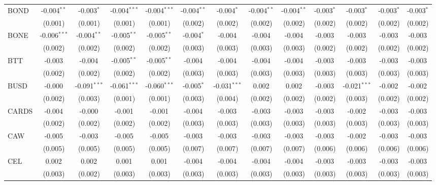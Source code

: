 \begin{table}[!htbp]
\begin{tabular}{@{\extracolsep{5pt}}lcccccccccccc}
 BOND & -0.004$^{**}$ & -0.003$^{*}$ & -0.004$^{***}$ & -0.004$^{***}$ & -0.004$^{**}$ & -0.004$^{*}$ & -0.004$^{**}$ & -0.004$^{**}$ & -0.003$^{*}$ & -0.003$^{*}$ & -0.003$^{*}$ & -0.003$^{*}$ \\
  & (0.001) & (0.001) & (0.001) & (0.001) & (0.002) & (0.002) & (0.002) & (0.002) & (0.002) & (0.002) & (0.002) & (0.002) \\
 BONE & -0.006$^{***}$ & -0.004$^{**}$ & -0.005$^{**}$ & -0.005$^{**}$ & -0.004$^{*}$ & -0.004$^{}$ & -0.004$^{}$ & -0.004$^{}$ & -0.003$^{}$ & -0.003$^{}$ & -0.003$^{}$ & -0.003$^{}$ \\
  & (0.002) & (0.002) & (0.002) & (0.002) & (0.003) & (0.003) & (0.003) & (0.003) & (0.002) & (0.002) & (0.002) & (0.002) \\
 BTT & -0.003$^{}$ & -0.004$^{}$ & -0.005$^{**}$ & -0.005$^{**}$ & -0.004$^{}$ & -0.004$^{}$ & -0.004$^{}$ & -0.004$^{}$ & -0.003$^{}$ & -0.003$^{}$ & -0.003$^{}$ & -0.003$^{}$ \\
  & (0.002) & (0.002) & (0.002) & (0.002) & (0.003) & (0.003) & (0.003) & (0.003) & (0.003) & (0.003) & (0.003) & (0.003) \\
 BUSD & -0.000$^{}$ & -0.091$^{***}$ & -0.061$^{***}$ & -0.060$^{***}$ & -0.005$^{*}$ & -0.031$^{***}$ & 0.002$^{}$ & 0.002$^{}$ & -0.003$^{}$ & -0.021$^{***}$ & -0.002$^{}$ & -0.002$^{}$ \\
  & (0.002) & (0.003) & (0.001) & (0.001) & (0.003) & (0.004) & (0.002) & (0.002) & (0.002) & (0.003) & (0.002) & (0.002) \\
 CARDS & -0.004$^{}$ & -0.000$^{}$ & -0.001$^{}$ & -0.001$^{}$ & -0.004$^{}$ & -0.003$^{}$ & -0.003$^{}$ & -0.003$^{}$ & -0.003$^{}$ & -0.002$^{}$ & -0.003$^{}$ & -0.003$^{}$ \\
  & (0.002) & (0.002) & (0.002) & (0.002) & (0.003) & (0.003) & (0.003) & (0.003) & (0.003) & (0.003) & (0.003) & (0.003) \\
 CAW & -0.005$^{}$ & -0.003$^{}$ & -0.005$^{}$ & -0.005$^{}$ & -0.003$^{}$ & -0.003$^{}$ & -0.003$^{}$ & -0.003$^{}$ & -0.003$^{}$ & -0.002$^{}$ & -0.003$^{}$ & -0.003$^{}$ \\
  & (0.005) & (0.005) & (0.005) & (0.005) & (0.007) & (0.007) & (0.007) & (0.007) & (0.006) & (0.006) & (0.006) & (0.006) \\
 CEL & 0.002$^{}$ & 0.002$^{}$ & 0.001$^{}$ & 0.001$^{}$ & -0.004$^{}$ & -0.004$^{}$ & -0.004$^{}$ & -0.004$^{}$ & -0.003$^{}$ & -0.003$^{}$ & -0.003$^{}$ & -0.003$^{}$ \\
  & (0.003) & (0.002) & (0.003) & (0.003) & (0.003) & (0.003) & (0.003) & (0.003) & (0.003) & (0.003) & (0.003) & (0.003) \\

\end{tabular}
\end{table}
